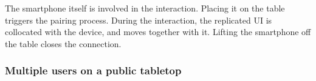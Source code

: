 The smartphone itself is involved in the interaction.
Placing it on the table triggers the pairing process.
During the interaction, the replicated UI is collocated with the device, and moves together with it.
Lifting the smartphone off the table closes the connection.




\subsubsection{Multiple users on a public tabletop}

